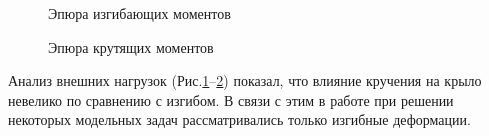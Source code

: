 \begin{figure}[H]
\centering
\def\svgwidth{0.9\textwidth}

\caption{Эпюра изгибающих моментов}
\label{fig:BendingMoments}
\end{figure}


%

%

%

\begin{figure}[H]
\centering
\def\svgwidth{0.9\textwidth}

\caption{Эпюра крутящих моментов}
\label{fig:RotatingMoments}
\end{figure}


Анализ внешних нагрузок (Рис.\ref{fig:BendingMoments}--\ref{fig:RotatingMoments}) показал, что влияние кручения на крыло невелико по сравнению с изгибом. В связи с этим  в работе при решении некоторых модельных задач рассматривались только изгибные деформации. 


